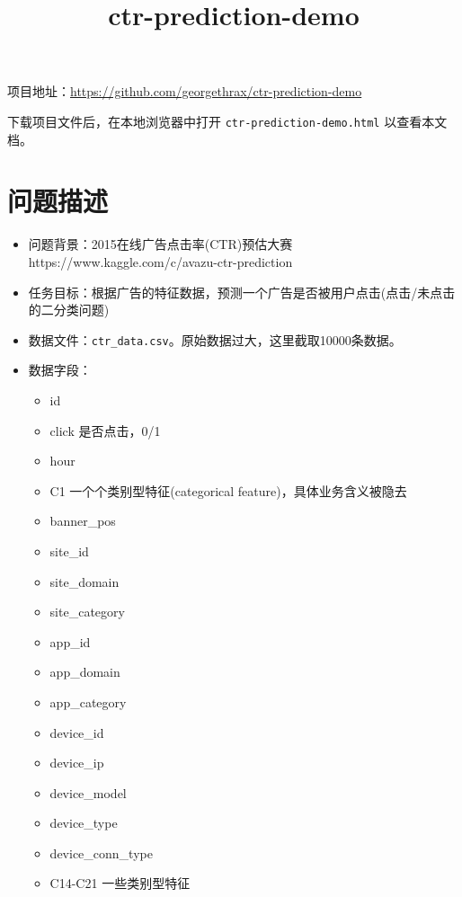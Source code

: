 \documentclass[11pt]{article}
\title{ctr-prediction-demo}
\providecommand{\tightlist}{%
      \setlength{\itemsep}{0pt}\setlength{\parskip}{0pt}}
\begin{document}
    
    
    \maketitle
    
    

    
    项目地址：\url{https://github.com/georgethrax/ctr-prediction-demo}

下载项目文件后，在本地浏览器中打开 \texttt{ctr-prediction-demo.html}
以查看本文档。

    \section{问题描述}\label{ux95eeux9898ux63cfux8ff0}

\begin{itemize}
\item
  问题背景：2015在线广告点击率(CTR)预估大赛
  https://www.kaggle.com/c/avazu-ctr-prediction
\item
  任务目标：根据广告的特征数据，预测一个广告是否被用户点击(点击/未点击的二分类问题)
\item
  数据文件：\texttt{ctr\_data.csv}。原始数据过大，这里截取10000条数据。
\item
  数据字段：

  \begin{itemize}
  \tightlist
  \item
    id
  \item
    click 是否点击，0/1
  \item
    hour
  \item
    C1 一个个类别型特征(categorical feature)，具体业务含义被隐去
  \item
    banner\_pos
  \item
    site\_id
  \item
    site\_domain
  \item
    site\_category
  \item
    app\_id
  \item
    app\_domain
  \item
    app\_category
  \item
    device\_id
  \item
    device\_ip
  \item
    device\_model
  \item
    device\_type
  \item
    device\_conn\_type
  \item
    C14-C21 一些类别型特征
  \end{itemize}
\end{itemize}
\end{document}
